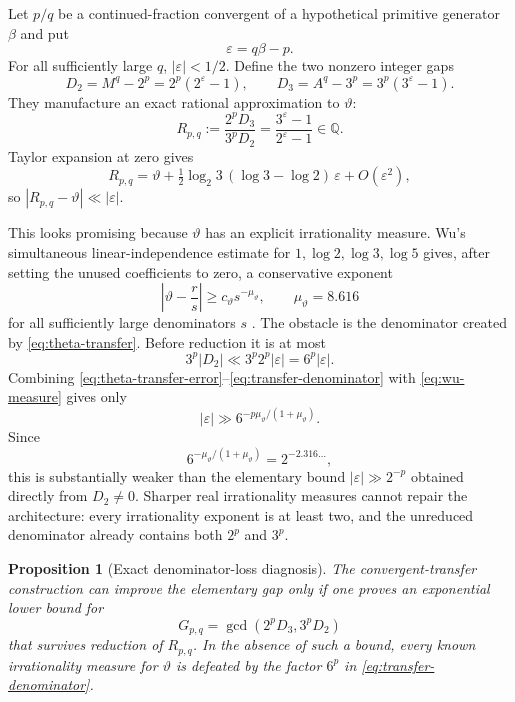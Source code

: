 \documentclass[11pt,oneside]{article}
\newtheorem{proposition}[theorem]{Proposition}
\theoremstyle{definition}
\theoremstyle{remark}
\newcommand{\Q}{\mathbb Q}
\begin{document}
Let $p/q$ be a continued-fraction convergent of a hypothetical primitive generator $\beta$ and
put
\[
 \varepsilon=q\beta-p.
\]
For all sufficiently large $q$, $|\varepsilon|<1/2$.  Define the two nonzero integer gaps
\begin{equation}\label{eq:D2D3}
 D_2=M^q-2^p=2^p(2^\varepsilon-1),
 \qquad
 D_3=A^q-3^p=3^p(3^\varepsilon-1).
\end{equation}
They manufacture an exact rational approximation to $\vartheta$:
\begin{equation}\label{eq:theta-transfer}
 R_{p,q}:=
 \frac{2^pD_3}{3^pD_2}
 =\frac{3^\varepsilon-1}{2^\varepsilon-1}
 \in\Q.
\end{equation}
Taylor expansion at zero gives
\begin{equation}\label{eq:theta-transfer-error}
 R_{p,q}=\vartheta+
 \tfrac12\log_2 3\,(\log3-\log2)\,\varepsilon
 +O(\varepsilon^2),
\end{equation}
so $|R_{p,q}-\vartheta|\ll|\varepsilon|$.

This looks promising because $\vartheta$ has an explicit irrationality measure.  Wu's
simultaneous linear-independence estimate for $1,\log2,\log3,\log5$ gives, after setting the
unused coefficients to zero, a conservative exponent
\begin{equation}\label{eq:wu-measure}
 \left|\vartheta-\frac rs\right|
 \ge c_\vartheta s^{-\mu_\vartheta},
 \qquad \mu_\vartheta=8.616
\end{equation}
for all sufficiently large denominators $s$ \cite{Wu2003}.  The obstacle is the denominator
created by \eqref{eq:theta-transfer}.  Before reduction it is at most
\begin{equation}\label{eq:transfer-denominator}
 3^p|D_2|
 \ll 3^p2^p|\varepsilon|
 =6^p|\varepsilon|.
\end{equation}
Combining \eqref{eq:theta-transfer-error}--\eqref{eq:transfer-denominator} with
\eqref{eq:wu-measure} gives only
\begin{equation}\label{eq:transfer-lower}
 |\varepsilon|
 \gg 6^{-p\mu_\vartheta/(1+\mu_\vartheta)}.
\end{equation}
Since
\[
 6^{-\mu_\vartheta/(1+\mu_\vartheta)}
 =2^{-2.316\ldots},
\]
this is substantially weaker than the elementary bound
$|\varepsilon|\gg2^{-p}$ obtained directly from $D_2\ne0$.  Sharper real irrationality
measures cannot repair the architecture: every irrationality exponent is at least two, and
the unreduced denominator already contains both $2^p$ and $3^p$.

\begin{proposition}[Exact denominator-loss diagnosis]\label{prop:transfer-loss}
The convergent-transfer construction can improve the elementary gap only if one proves an
exponential lower bound for
\begin{equation}\label{eq:transfer-gcd}
 G_{p,q}=\gcd(2^pD_3,3^pD_2)
\end{equation}
that survives reduction of $R_{p,q}$.  In the absence of such a bound, every known
irrationality measure for $\vartheta$ is defeated by the factor $6^p$ in
\eqref{eq:transfer-denominator}.
\end{proposition}
\end{document}
